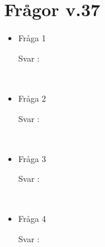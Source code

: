\documentclass{article}
\date {#1}
\title {
    \documentTitle {Helsingborg Event and Convention Bureau}
    
    \documentDate {}
}
\begin{document}
\maketitle
\thispagestyle{empty}

\newpage




\newpage

\section{Frågor v.37}

 
\begin{itemize}
    \item Fråga 1
        \begin{description}
            \item[Svar :]
        \end{description}
    \\
     \item Fråga 2
        \begin{description}
            \item[Svar :]
        \end{description}
    \\
    \item Fråga 3
        \begin{description}
            \item[Svar :]
        \end{description}  
    \\
     \item Fråga 4
        \begin{description}
            \item[Svar :]
        \end{description}
    \\
\end{itemize}
\end{document}
